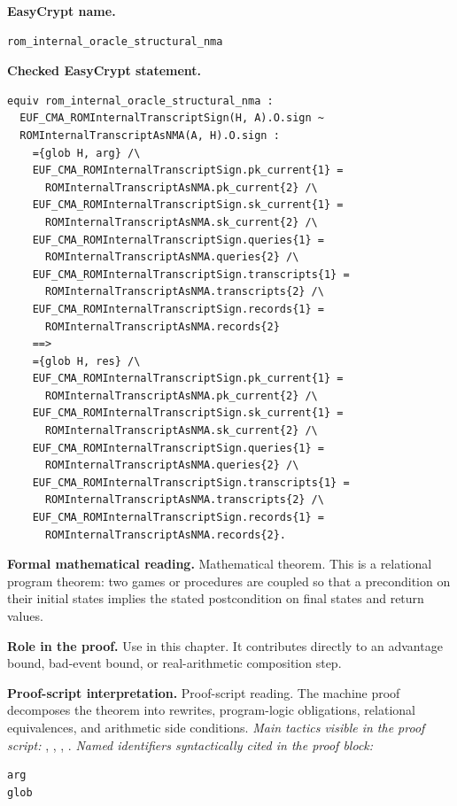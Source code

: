 \begin{formaltheorem}
\noindent\textbf{EasyCrypt name.}
\begin{lstlisting}[language=EasyCrypt,basicstyle=\ttfamily\scriptsize]
rom_internal_oracle_structural_nma
\end{lstlisting}
\noindent\textbf{Checked EasyCrypt statement.}
\begin{lstlisting}[language=EasyCrypt,basicstyle=\ttfamily\scriptsize]
equiv rom_internal_oracle_structural_nma :
  EUF_CMA_ROMInternalTranscriptSign(H, A).O.sign ~
  ROMInternalTranscriptAsNMA(A, H).O.sign :
    ={glob H, arg} /\
    EUF_CMA_ROMInternalTranscriptSign.pk_current{1} =
      ROMInternalTranscriptAsNMA.pk_current{2} /\
    EUF_CMA_ROMInternalTranscriptSign.sk_current{1} =
      ROMInternalTranscriptAsNMA.sk_current{2} /\
    EUF_CMA_ROMInternalTranscriptSign.queries{1} =
      ROMInternalTranscriptAsNMA.queries{2} /\
    EUF_CMA_ROMInternalTranscriptSign.transcripts{1} =
      ROMInternalTranscriptAsNMA.transcripts{2} /\
    EUF_CMA_ROMInternalTranscriptSign.records{1} =
      ROMInternalTranscriptAsNMA.records{2}
    ==>
    ={glob H, res} /\
    EUF_CMA_ROMInternalTranscriptSign.pk_current{1} =
      ROMInternalTranscriptAsNMA.pk_current{2} /\
    EUF_CMA_ROMInternalTranscriptSign.sk_current{1} =
      ROMInternalTranscriptAsNMA.sk_current{2} /\
    EUF_CMA_ROMInternalTranscriptSign.queries{1} =
      ROMInternalTranscriptAsNMA.queries{2} /\
    EUF_CMA_ROMInternalTranscriptSign.transcripts{1} =
      ROMInternalTranscriptAsNMA.transcripts{2} /\
    EUF_CMA_ROMInternalTranscriptSign.records{1} =
      ROMInternalTranscriptAsNMA.records{2}.
\end{lstlisting}
\noindent\textbf{Formal mathematical reading.}
Mathematical theorem. This is a relational program theorem: two games or procedures are coupled so that a precondition on their initial states implies the stated postcondition on final states and return values.

\noindent\textbf{Role in the proof.}
Use in this chapter. It contributes directly to an advantage bound, bad-event bound, or real-arithmetic composition step.

\noindent\textbf{Proof-script interpretation.}
Proof-script reading. The machine proof decomposes the theorem into rewrites, program-logic obligations, relational equivalences, and arithmetic side conditions.
\emph{Main tactics visible in the proof script:} , , , .
\emph{Named identifiers syntactically cited in the proof block:}
\begin{lstlisting}[language=EasyCrypt,basicstyle=\ttfamily\scriptsize]
arg
glob
\end{lstlisting}

\end{formaltheorem}


